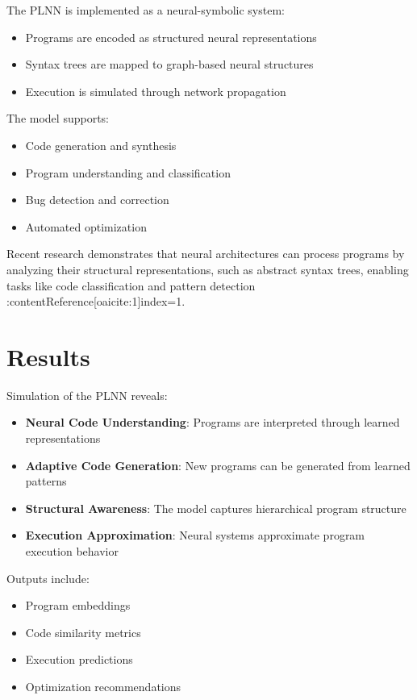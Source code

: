 \documentclass[12pt]{article}
\begin{document}
The PLNN is implemented as a neural-symbolic system:

\begin{itemize}
\item Programs are encoded as structured neural representations
\item Syntax trees are mapped to graph-based neural structures
\item Execution is simulated through network propagation
\end{itemize}

The model supports:

\begin{itemize}
\item Code generation and synthesis
\item Program understanding and classification
\item Bug detection and correction
\item Automated optimization
\end{itemize}

Recent research demonstrates that neural architectures can process programs by analyzing their structural representations, such as abstract syntax trees, enabling tasks like code classification and pattern detection :contentReference[oaicite:1]{index=1}.

\section{Results}

Simulation of the PLNN reveals:

\begin{itemize}
\item \textbf{Neural Code Understanding}: Programs are interpreted through learned representations
\item \textbf{Adaptive Code Generation}: New programs can be generated from learned patterns
\item \textbf{Structural Awareness}: The model captures hierarchical program structure
\item \textbf{Execution Approximation}: Neural systems approximate program execution behavior
\end{itemize}

Outputs include:

\begin{itemize}
\item Program embeddings
\item Code similarity metrics
\item Execution predictions
\item Optimization recommendations
\end{itemize}
\end{document}
